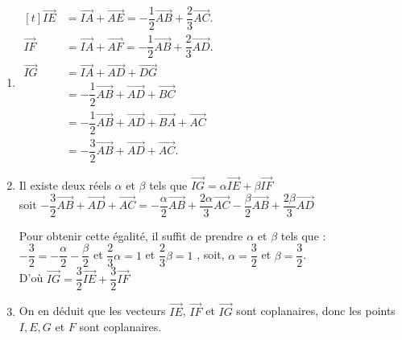 \begin{methode*1}
\correction

\begin{enumerate}
\item
  $ \begin{aligned}[t]
 \overrightarrow{IE} &= \overrightarrow{IA}+\overrightarrow{AE}=-\dfrac{1}{2}\overrightarrow{AB}+\dfrac{2}{3}\overrightarrow{AC}.\\
%
  \overrightarrow{IF}
  &=\overrightarrow{IA}+\overrightarrow{AF}=-\dfrac{1}{2}\overrightarrow{AB}+\dfrac{2}{3}\overrightarrow{AD}.\\
%
   \overrightarrow {IG}&=\overrightarrow{IA}+\overrightarrow{AD}+\overrightarrow{DG}\\
    &=-\dfrac{1}{2}\overrightarrow{AB}+\overrightarrow{AD}+\overrightarrow{BC}\\
    &=-\dfrac{1}{2}\overrightarrow{AB}+\overrightarrow{AD}+\overrightarrow{BA}+\overrightarrow{AC}\\
    &=-\dfrac{3}{2}\overrightarrow{AB}+\overrightarrow{AD}+\overrightarrow{AC}.
  \end{aligned}
  $

\item Il existe deux réels $\alpha$ et $\beta$ tels que
  $\overrightarrow{IG}=\alpha\overrightarrow{IE}+\beta\overrightarrow{IF}$
  \\[1mm]
  soit
  $
  -\dfrac{3}{2}\overrightarrow{AB}+\overrightarrow{AD}+\overrightarrow{AC}=-\dfrac{\alpha}{2}\overrightarrow{AB}+\dfrac{2\alpha}{3}\overrightarrow{AC}-\dfrac{\beta}{2}\overrightarrow{AB}+\dfrac{2\beta}{3}\overrightarrow{AD}$

\vspace{1mm}

Pour obtenir cette égalité, il suffit de prendre $\alpha$ et $\beta$
tels que : \\[1mm]
$-\dfrac{3}{2}=-\dfrac{\alpha}{2}-\dfrac{\beta}{2}$ et $\dfrac{2}{3} \alpha=1$ et $\dfrac{2}{3} \beta=1$ , soit, $ \alpha=\dfrac{3}{2}$ et $\beta=\dfrac{3}{2}$.\\[1mm]
D'où
$\overrightarrow{IG}=\dfrac{3}{2}\overrightarrow{IE}+\dfrac{3}{2}\overrightarrow{IF}$

\item On en déduit que les vecteurs $\overrightarrow{IE}$, $
  \overrightarrow{IF}$ et $\overrightarrow{IG}$ sont coplanaires, donc
  les points $I, E, G$ et $F$ sont coplanaires.
\end{enumerate}

\vspace{-2\baselineskip}
\end{methode*1}

